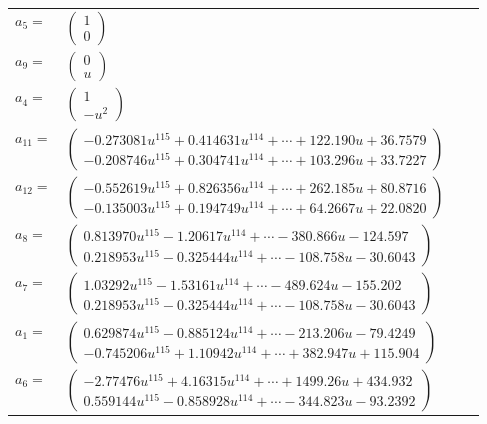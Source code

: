 \documentclass[1p]{elsarticle_modified}
\theoremstyle{definition}
\begin{document}
\begin{tabular}{m{7pt} m{180pt} m{7pt} m{180pt} }
\flushright $a_{5}=$&$\begin{pmatrix}1\\0\end{pmatrix}$ \\
\flushright $a_{9}=$&$\begin{pmatrix}0\\u\end{pmatrix}$ \\
\flushright $a_{4}=$&$\begin{pmatrix}1\\- u^2\end{pmatrix}$ \\
\flushright $a_{11}=$&$\begin{pmatrix}-0.273081 u^{115}+0.414631 u^{114}+\cdots+122.190 u+36.7579\\-0.208746 u^{115}+0.304741 u^{114}+\cdots+103.296 u+33.7227\end{pmatrix}$ \\
\flushright $a_{12}=$&$\begin{pmatrix}-0.552619 u^{115}+0.826356 u^{114}+\cdots+262.185 u+80.8716\\-0.135003 u^{115}+0.194749 u^{114}+\cdots+64.2667 u+22.0820\end{pmatrix}$ \\
\flushright $a_{8}=$&$\begin{pmatrix}0.813970 u^{115}-1.20617 u^{114}+\cdots-380.866 u-124.597\\0.218953 u^{115}-0.325444 u^{114}+\cdots-108.758 u-30.6043\end{pmatrix}$ \\
\flushright $a_{7}=$&$\begin{pmatrix}1.03292 u^{115}-1.53161 u^{114}+\cdots-489.624 u-155.202\\0.218953 u^{115}-0.325444 u^{114}+\cdots-108.758 u-30.6043\end{pmatrix}$ \\
\flushright $a_{1}=$&$\begin{pmatrix}0.629874 u^{115}-0.885124 u^{114}+\cdots-213.206 u-79.4249\\-0.745206 u^{115}+1.10942 u^{114}+\cdots+382.947 u+115.904\end{pmatrix}$ \\
\flushright $a_{6}=$&$\begin{pmatrix}-2.77476 u^{115}+4.16315 u^{114}+\cdots+1499.26 u+434.932\\0.559144 u^{115}-0.858928 u^{114}+\cdots-344.823 u-93.2392\end{pmatrix}$ \\

\end{tabular}
\end{document}
